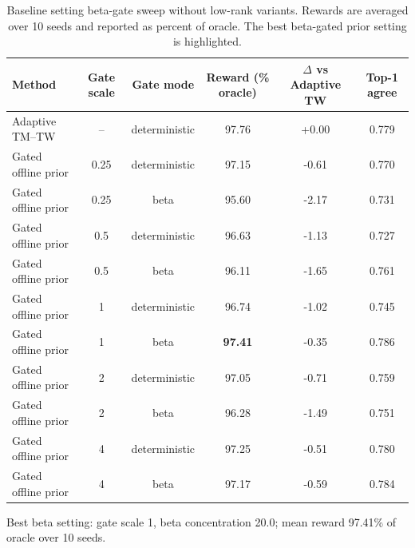 \begin{table}[t]
\centering
\caption{Baseline setting beta-gate sweep without low-rank variants. Rewards are averaged over 10 seeds and reported as percent of oracle. The best beta-gated prior setting is highlighted.}
\label{tab:baseline_beta_gate_sweep_no_lr}
\begin{tabular}{lccccc}
\toprule
Method & Gate scale & Gate mode & Reward (\% oracle) & $\Delta$ vs Adaptive TW & Top-1 agree \\
\midrule
Adaptive TM--TW & -- & deterministic & 97.76 & +0.00 & 0.779 \\
\addlinespace
Gated offline prior & 0.25 & deterministic & 97.15 & -0.61 & 0.770 \\
Gated offline prior & 0.25 & beta & 95.60 & -2.17 & 0.731 \\
Gated offline prior & 0.5 & deterministic & 96.63 & -1.13 & 0.727 \\
Gated offline prior & 0.5 & beta & 96.11 & -1.65 & 0.761 \\
Gated offline prior & 1 & deterministic & 96.74 & -1.02 & 0.745 \\
Gated offline prior & 1 & beta & \textbf{97.41} & -0.35 & 0.786 \\
Gated offline prior & 2 & deterministic & 97.05 & -0.71 & 0.759 \\
Gated offline prior & 2 & beta & 96.28 & -1.49 & 0.751 \\
Gated offline prior & 4 & deterministic & 97.25 & -0.51 & 0.780 \\
Gated offline prior & 4 & beta & 97.17 & -0.59 & 0.784 \\
\bottomrule
\end{tabular}
\vspace{0.25em}
\footnotesize{Best beta setting: gate scale 1, beta concentration 20.0; mean reward 97.41\% of oracle over 10 seeds.}
\end{table}
